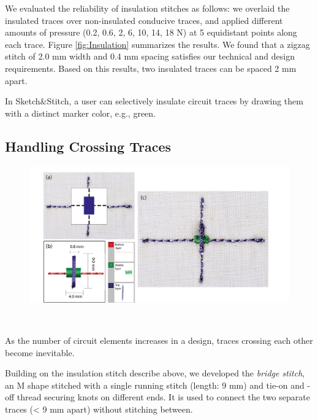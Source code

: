 \documentclass[header.tex]{subfiles}
\begin{document}
We evaluated the reliability of insulation stitches as follows: we overlaid the insulated traces over non-insulated conducive traces, and applied different amounts of pressure (0.2, 0.6, 2, 6, 10, 14, 18 N) at 5 equidistant points along each trace. Figure \ref{fig:Insulation} summarizes the results. We found that a zigzag stitch of 2.0 mm width and 0.4 mm spacing satisfies our technical and design requirements. Based on this results, two insulated traces can be spaced 2 mm apart.

In Sketch\&Stitch, a user can selectively insulate circuit traces by drawing them with a distinct marker color, e.g., green.



\subsection{Handling Crossing Traces}
\begin{figure}
\centering
  \includegraphics[width=0.7\columnwidth]{figures/BridgeStitch}
  \caption{}~\label{fig:BridgeStitch}
  \vspace{-2.5em}
\end{figure}
As the number of circuit elements increases in a design, traces crossing each other become inevitable. 

Building on the insulation stitch describe above, we developed the \textit{bridge stitch}, an M shape stitched with a single running stitch (length: 9 mm) and tie-on and -off thread securing knots on different ends. It is used to connect the two separate traces (< 9 mm apart) without stitching between.
\end{document}
